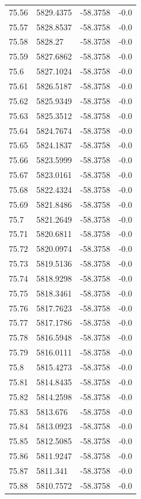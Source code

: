\begin{table}[H]
\begin{tabular}{llll}
75.56 & 5829.4375 & -58.3758 & -0.0 \\
75.57 & 5828.8537 & -58.3758 & -0.0 \\
75.58 & 5828.27 & -58.3758 & -0.0 \\
75.59 & 5827.6862 & -58.3758 & -0.0 \\
75.6 & 5827.1024 & -58.3758 & -0.0 \\
75.61 & 5826.5187 & -58.3758 & -0.0 \\
75.62 & 5825.9349 & -58.3758 & -0.0 \\
75.63 & 5825.3512 & -58.3758 & -0.0 \\
75.64 & 5824.7674 & -58.3758 & -0.0 \\
75.65 & 5824.1837 & -58.3758 & -0.0 \\
75.66 & 5823.5999 & -58.3758 & -0.0 \\
75.67 & 5823.0161 & -58.3758 & -0.0 \\
75.68 & 5822.4324 & -58.3758 & -0.0 \\
75.69 & 5821.8486 & -58.3758 & -0.0 \\
75.7 & 5821.2649 & -58.3758 & -0.0 \\
75.71 & 5820.6811 & -58.3758 & -0.0 \\
75.72 & 5820.0974 & -58.3758 & -0.0 \\
75.73 & 5819.5136 & -58.3758 & -0.0 \\
75.74 & 5818.9298 & -58.3758 & -0.0 \\
75.75 & 5818.3461 & -58.3758 & -0.0 \\
75.76 & 5817.7623 & -58.3758 & -0.0 \\
75.77 & 5817.1786 & -58.3758 & -0.0 \\
75.78 & 5816.5948 & -58.3758 & -0.0 \\
75.79 & 5816.0111 & -58.3758 & -0.0 \\
75.8 & 5815.4273 & -58.3758 & -0.0 \\
75.81 & 5814.8435 & -58.3758 & -0.0 \\
75.82 & 5814.2598 & -58.3758 & -0.0 \\
75.83 & 5813.676 & -58.3758 & -0.0 \\
75.84 & 5813.0923 & -58.3758 & -0.0 \\
75.85 & 5812.5085 & -58.3758 & -0.0 \\
75.86 & 5811.9247 & -58.3758 & -0.0 \\
75.87 & 5811.341 & -58.3758 & -0.0 \\
75.88 & 5810.7572 & -58.3758 & -0.0 \\

\end{tabular}
\end{table}
